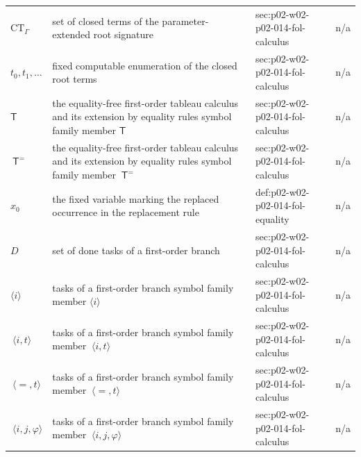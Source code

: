 \begin{longtable}{@{}p{}p{}p{}p{}@{}}
\(\mathrm{CT}_{\Gamma}\) & set of closed terms of the parameter-extended root signature & sec:\allowbreak{}p02-\allowbreak{}w02-\allowbreak{}p02-\allowbreak{}014-\allowbreak{}fol-\allowbreak{}calculus & n/a \\
\(t_0,\allowbreak t_1,\allowbreak \ldots\) & fixed computable enumeration of the closed root terms & sec:\allowbreak{}p02-\allowbreak{}w02-\allowbreak{}p02-\allowbreak{}014-\allowbreak{}fol-\allowbreak{}calculus & n/a \\
\(\mathsf T\) & the equality-free first-order tableau calculus and its extension by equality rules symbol family member \(\mathsf T\) & sec:\allowbreak{}p02-\allowbreak{}w02-\allowbreak{}p02-\allowbreak{}014-\allowbreak{}fol-\allowbreak{}calculus & n/a \\
\(\ \mathsf T^{=}\) & the equality-free first-order tableau calculus and its extension by equality rules symbol family member \(\ \mathsf T^{=}\) & sec:\allowbreak{}p02-\allowbreak{}w02-\allowbreak{}p02-\allowbreak{}014-\allowbreak{}fol-\allowbreak{}calculus & n/a \\
\(x_0\) & the fixed variable marking the replaced occurrence in the replacement rule & def:\allowbreak{}p02-\allowbreak{}w02-\allowbreak{}p02-\allowbreak{}014-\allowbreak{}fol-\allowbreak{}equality & n/a \\
\(D\) & set of done tasks of a first-order branch & sec:\allowbreak{}p02-\allowbreak{}w02-\allowbreak{}p02-\allowbreak{}014-\allowbreak{}fol-\allowbreak{}calculus & n/a \\
\(\langle i\rangle\) & tasks of a first-order branch symbol family member \(\langle i\rangle\) & sec:\allowbreak{}p02-\allowbreak{}w02-\allowbreak{}p02-\allowbreak{}014-\allowbreak{}fol-\allowbreak{}calculus & n/a \\
\(\ \langle i,\allowbreak t\rangle\) & tasks of a first-order branch symbol family member \(\ \langle i,t\rangle\) & sec:\allowbreak{}p02-\allowbreak{}w02-\allowbreak{}p02-\allowbreak{}014-\allowbreak{}fol-\allowbreak{}calculus & n/a \\
\(\ \langle{=},\allowbreak t\rangle\) & tasks of a first-order branch symbol family member \(\ \langle{=},t\rangle\) & sec:\allowbreak{}p02-\allowbreak{}w02-\allowbreak{}p02-\allowbreak{}014-\allowbreak{}fol-\allowbreak{}calculus & n/a \\
\(\ \langle i,\allowbreak j,\allowbreak \varphi\rangle\) & tasks of a first-order branch symbol family member \(\ \langle i,j,\varphi\rangle\) & sec:\allowbreak{}p02-\allowbreak{}w02-\allowbreak{}p02-\allowbreak{}014-\allowbreak{}fol-\allowbreak{}calculus & n/a \\

\end{longtable}
